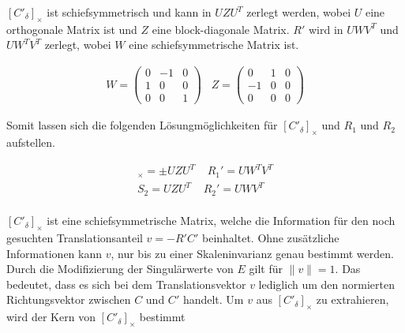 $[C'_\delta]_\times$ ist schiefsymmetrisch und kann in $UZU^T$ zerlegt werden, wobei $U$ eine orthogonale Matrix ist und $Z$ eine block-diagonale Matrix\cite{HZ}. $R'$ wird in $UWV^T$ und $UW^TV^T$ zerlegt, wobei $W$ eine schiefsymmetrische Matrix ist\cite{Ferid,HZ,phdextrinsicPara}.%



\begin{gather}
W = \begin{pmatrix}
0&-1&0\\
1&0&0\\
0&0&1
\end{pmatrix} \;\;\;
Z=
\begin{pmatrix}
0&1&0\\
-1&0&0\\
0&0&0
\end{pmatrix}
\end{gather}


Somit lassen sich die folgenden Lösungmöglichkeiten für $[C'_\delta]_\times$ und $R_1$ und $R_2$ aufstellen\cite{HZ,Ferid}.


\begin{gather}
[C'_\delta]_\times = \pm UZU^T \;\;\;\; R_1' = UW^TV^T\\
S_2 = UZU^T \;\;\;\; R_2' = UWV^T
\end{gather}\\



$[C'_\delta]_\times$ ist eine schiefsymmetrische Matrix, welche die Information für den noch gesuchten Translationsanteil $v = -R'C'$ beinhaltet. Ohne zusätzliche Informationen kann $v$, nur bis zu einer Skaleninvarianz genau bestimmt werden\cite{HZ,Ferid,phdextrinsicPara}. Durch die Modifizierung der Singulärwerte von $E$ gilt für $\parallel v \parallel = 1$\cite{HZ,Ferid}. Das bedeutet, dass es sich bei dem Translationsvektor $v$ lediglich um den normierten Richtungsvektor zwischen $C$ und $C'$ handelt\cite{KIT}. Um $v$ aus $[C'_\delta]_\times$ zu extrahieren, wird der Kern von $[C'_\delta]_\times$ bestimmt

